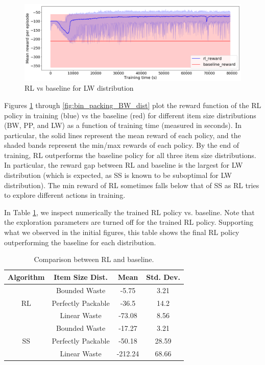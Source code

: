 \documentclass{article}
\begin{document}
\begin{figure}[h!]
	\centering
	\includegraphics[width=1\linewidth]{images/bin_packing_rl_vs_linear_waste_binsize_9.png}
	\caption{RL vs baseline for LW distribution}
	\label{fig:bin_packing_LW_dist}
\end{figure}
Figures \ref{fig:bin_packing_LW_dist} through \ref{fig:bin_packing_BW_dist} plot the reward function of the RL policy in training (blue) vs the baseline (red) for different item size distributions (BW, PP, and LW) as a function of training time (measured in seconds). In particular, the solid lines represent the mean reward of each policy, and the shaded bands represent the min/max rewards of each policy.  By the end of training, RL outperforms the baseline policy for all three item size distributions. In particular, the reward gap between RL and baseline is the largest for LW distribution (which is expected, as SS is known to be suboptimal for LW distribution). The min reward of RL sometimes falls below that of SS as RL tries to explore different actions in training.

In Table \ref{table:bin_packing_RL_baseline_comp}, we inspect numerically the trained RL policy vs. baseline.  Note that the exploration parameters are turned off for the trained RL policy.  Supporting what we observed in the initial figures, this table shows the final RL policy outperforming the baseline for each distribution.
\begin{table}[h!]
	\centering
	\begin{tabular}{ |c|c|c|c| } 
		\hline
		Algorithm & Item Size Dist. & Mean & Std. Dev. \\ 
		\hline
		\multirow{3}{4em}{RL}  & Bounded Waste & -5.75  & 3.21 \\ 
		& Perfectly Packable & -36.5 & 14.2 \\
		& Linear Waste  &  -73.08 &  8.56 \\
		\hline	
		\multirow{3}{4em}{SS} & Bounded Waste & -17.27  & 3.21 \\ 
		& Perfectly Packable & -50.18 & 28.59 \\ 
		& Linear Waste &  -212.24 & 68.66 \\ 
		\hline
	\end{tabular}
	\caption{Comparison between RL and baseline.}
	\label{table:bin_packing_RL_baseline_comp}
\end{table}
\end{document}

